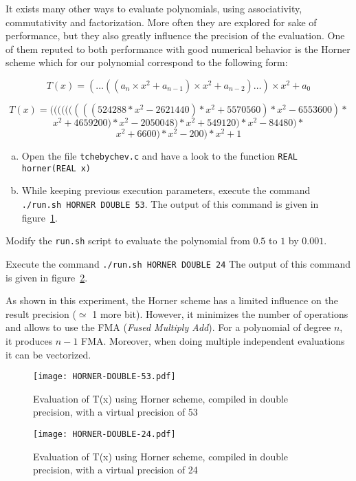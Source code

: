 It exists many other ways to evaluate polynomials, using associativity, commutativity and factorization. More often they are explored for sake of performance, but they also greatly influence the precision of the evaluation. One of them reputed to both performance with good numerical behavior is the Horner scheme which for our polynomial correspond to the following form:

\[
	T(x) = (\dots((a_n\times x^2 + a_{n-1})\times x^2 + a_{n-2})\dots) \times x^2
    + a_0
\]

$$T(x) = (((((((((524288*x^2-2621440)*x^2+5570560)*x^2-6553600)*$$
$$x^2+4659200)*x^2-2050048)*x^2+549120)*x^2-84480)*$$
$$x^2+6600)*x^2-200)*x^2+1$$

\begin{question}
  \begin{enumerate}[(a)]
  \item Open the file {\tt tchebychev.c} and have a look to the function {\tt REAL horner(REAL x)}
\item While keeping previous execution parameters, execute the command {\tt ./run.sh HORNER DOUBLE 53}.  \newline The output of this command is given in figure~\ref{fig:horner:double:53}.
  \end{enumerate}
\end{question}

\begin{question}
 \item Modify the {\tt run.sh} script to evaluate the polynomial from $0.5$ to $1$ by $0.001$.
\item Execute the command {\tt ./run.sh HORNER DOUBLE 24}  \newline
The output of this command is given in figure~\ref{fig:horner:double:24}.

\end{question}

As shown in this experiment, the Horner scheme has a limited influence on the result precision ($\simeq$ 1 more bit). However, it minimizes the number of operations and allows to use the FMA ({\it Fused Multiply Add}). For a polynomial of degree $n$, it produces $n-1$ FMA. Moreover, when doing multiple independent evaluations it can be vectorized.


\begin{figure}[htb]
\center \texttt{[image: HORNER-DOUBLE-53.pdf]}
  \caption{Evaluation of T(x) using Horner scheme, compiled in double precision, with a virtual precision of 53}
  \label{fig:horner:double:53}
\end{figure}
\begin{figure}[htb]
\center \texttt{[image: HORNER-DOUBLE-24.pdf]}
  \caption{Evaluation of T(x) using Horner scheme, compiled in double precision, with a virtual precision of 24}
  \label{fig:horner:double:24}
\end{figure}


